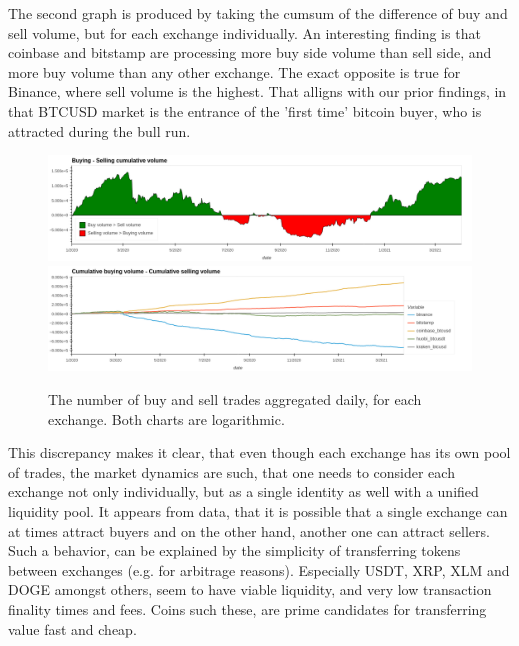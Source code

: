 \documentclass[10pt]{asme2ej}
\begin{document}
The second graph is produced by taking the cumsum of the difference of buy and sell volume, but for each exchange individually. An interesting finding is that coinbase and bitstamp are processing more buy side volume than sell side, and more buy volume than any other exchange. The exact opposite is true for Binance, where sell volume is the highest. That alligns with our prior findings, in that BTCUSD market is the entrance of the 'first time' bitcoin buyer, who is attracted during the bull run. 


\begin{figure}[H]
	\centering
	\includegraphics[width=12cm, height = 2.8cm]{buy-sell.png} \\
	\includegraphics[width=12cm, height = 2.8cm]{cumdif.png} \\ 
	\caption{The number of buy and sell trades aggregated daily, for each exchange. Both charts are logarithmic.}
	\label{fig:cum}
\end{figure}


This discrepancy makes it clear, that even though each exchange has its own pool of
trades, the market dynamics are such, that one needs to consider each exchange not
only individually, but as a single identity as well with a unified liquidity pool. It appears from data, that it is possible that a single exchange can at times attract buyers and on the other hand, another one can attract sellers.
Such a behavior, can be explained by the simplicity of 
transferring tokens between exchanges (e.g. for arbitrage reasons). Especially USDT, XRP,
XLM and DOGE amongst others, seem to have viable liquidity, and very low
transaction finality times and fees. Coins such these, are prime candidates for transferring value fast and cheap.

\end{document}
